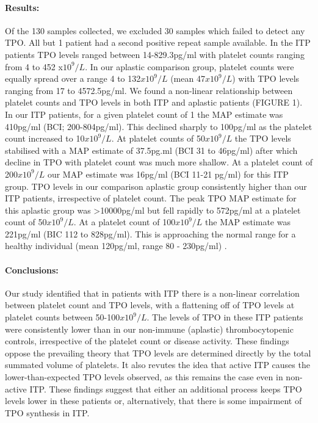 \documentclass[11pt]{article}
\begin{document}
\paragraph{Results:} Of the 130 samples collected, we excluded 30 samples which failed to detect any TPO. All but 1 patient had a second positive repeat sample available. In the ITP patients TPO levels ranged between 14-829.3pg/ml with platelet counts ranging from 4 to 452 x$10^9/L$. In our aplastic comparison group, platelet counts were equally spread over a range 4 to 132$x10^9/L$ (mean 47$x10^9/L$) with TPO levels ranging from 17 to 4572.5pg/ml. We found a non-linear relationship between platelet counts and TPO levels in both ITP and aplastic patients (FIGURE 1). In our ITP patients, for a given platelet count of 1 the MAP estimate was 410pg/ml (BCI; 200-804pg/ml). This declined sharply to 100pg/ml as the platelet count increased to 10$x10^9/L$. At platelet counts of 50$x10^9/L$ the TPO levels stabilised with a MAP estimate of 37.5pg.ml (BCI 31 to 46pg/ml) after which decline in TPO with platelet count was much more shallow. At a platelet count of 200$x10^9/L$ our MAP estimate was 16pg/ml (BCI 11-21 pg/ml) for this ITP group. TPO levels in our comparison aplastic group consistently higher than our ITP patients, irrespective of platelet count. The peak TPO MAP estimate for this aplastic group was >10000pg/ml but fell rapidly to 572pg/ml at a platelet count of 50$x10^9/L$. At a platelet count of 100$x10^9/L$ the MAP estimate was 221pg/ml (BIC 112 to 828pg/ml). This is approaching the normal range for a healthy individual (mean 120pg/ml, range 80 - 230pg/ml) \cite{SinghCirculatingthrombopoietinlevels2015}.



\paragraph{Conclusions:} Our study identified that in patients with ITP there is a non-linear correlation between platelet count and TPO levels, with a flattening off of TPO levels at platelet counts between 50-100$x10^9/L$. The levels of TPO in these ITP patients were consistently lower than in our non-immune (aplastic) thrombocytopenic controls, irrespective of the platelet count or disease activity. These findings oppose the prevailing theory that TPO levels are determined directly by the total summated volume of platelets. It also revutes the idea that active ITP causes the lower-than-expected TPO levels observed, as this remains the case even in non-active ITP. These findings suggest that either an additional process keeps TPO levels lower in these patients or, alternatively, that there is some impairment of TPO synthesis in ITP.
\end{document}

